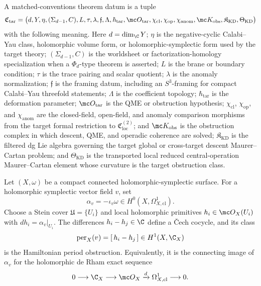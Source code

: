 \begin{defn}\label{defn:matched-conventions-theorem-datum}
  A matched-conventions theorem datum is a tuple
  \[
  \mathfrak C_{\mathrm{tar}}=
  \bigl(
    d,Y,\eta,(\Sigma_{d-1},C),L,\tau,\lambda,\mathfrak f,\Lambda,
    \hbar_{\mathrm{tar}},\mc O_{\mathrm{tar}},
    \chi_{\mathrm{cl}},\chi_{\mathrm{op}},\chi_{\mathrm{anom}},
    \mc K_{\mathrm{obs}},\mathfrak K_{\mathrm{KD}},\Theta_{\mathrm{KD}}
  \bigr)
  \]
  with the following meaning.  Here \(d=\dim_\C Y\);
  \(\eta\) is the negative-cyclic Calabi--Yau class, holomorphic volume
  form, or holomorphic-symplectic form used by the target theory;
  \((\Sigma_{d-1},C)\) is the worldsheet or factorization-homology
  specialization when a \(\Phi_d\)-type theorem is asserted; \(L\) is the
  brane or boundary condition; \(\tau\) is the trace pairing and scalar
  quotient; \(\lambda\) is the anomaly normalization; \(\mathfrak f\) is the
  framing datum, including an \(S^3\)-framing for compact Calabi--Yau threefold
  statements; \(\Lambda\) is the coefficient topology; \(\hbar_{\mathrm{tar}}\)
  is the deformation parameter; \(\mc O_{\mathrm{tar}}\) is the QME or
  obstruction hypothesis; \(\chi_{\mathrm{cl}}\), \(\chi_{\mathrm{op}}\),
  and \(\chi_{\mathrm{anom}}\) are the closed-field, open-field, and anomaly
  comparison morphisms from the target formal restriction to
  \(\mathfrak C_{\mathrm{loc}}^{(2)}\); and
  \(\mc K_{\mathrm{obs}}\) is the obstruction complex in which descent,
  QME, and operadic coherence are solved;
  \(\mathfrak K_{\mathrm{KD}}\) is the filtered dg Lie algebra governing
  the target global or cross-target descent Maurer--Cartan problem; and
  \(\Theta_{\mathrm{KD}}\) is the transported local reduced
  central-operation Maurer--Cartan element whose curvature is the target
  obstruction class.
\end{defn}

\begin{defn}\label{defn:compact-hamiltonian-period-complex}
  Let \((X,\omega)\) be a compact connected holomorphic-symplectic
  surface.  For a holomorphic symplectic vector field \(v\), set
  \[
    \alpha_v=-\iota_v\omega\in H^0(X,\Omega^1_{X,\mathrm{cl}}).
  \]
  Choose a Stein cover \(\mathfrak U=\{U_i\}\) and local holomorphic
  primitives \(h_i\in\mc O_X(U_i)\) with \(dh_i=\alpha_v|_{U_i}\).
  The differences \(h_i-h_j\in\C\) define a \v{C}ech cocycle, and its class
  \[
    \operatorname{per}_X(v)=
    [\,h_i-h_j\,]\in H^1(X,\C_X)
  \]
  is the Hamiltonian period obstruction.  Equivalently, it is the
  connecting image of \(\alpha_v\) for the holomorphic de Rham exact
  sequence
  \[
    0\longrightarrow\C_X\longrightarrow\mc O_X
      \xrightarrow{d}\Omega^1_{X,\mathrm{cl}}\longrightarrow0.
  \]
\end{defn}

